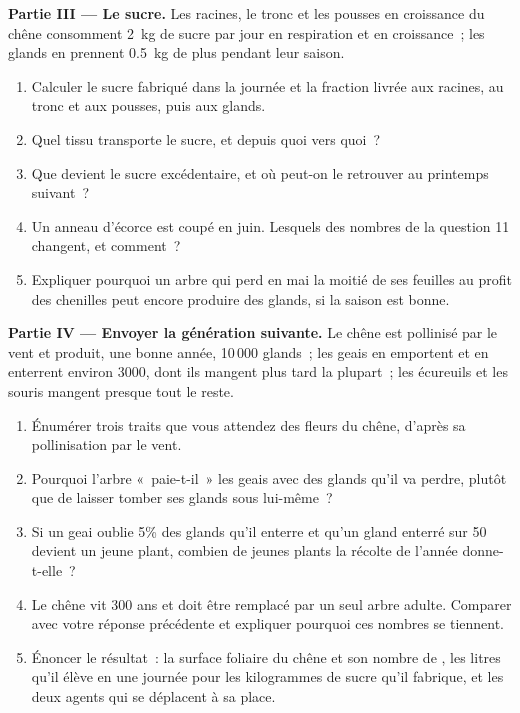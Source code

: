 \begin{problem}
\medskip
\noindent\textbf{Partie III --- Le sucre.}
Les racines, le tronc et les pousses en croissance du chêne consomment
\qty{2}{kg} de sucre par jour en respiration et en croissance~; les
glands en prennent \qty{0.5}{kg} de plus pendant leur saison.
\begin{enumerate}[resume]
  \item Calculer le sucre fabriqué dans la journée et la fraction
        livrée aux racines, au tronc et aux pousses, puis aux glands.
  \item Quel tissu transporte le sucre, et depuis quoi vers quoi~?
  \item Que devient le sucre excédentaire, et où peut-on le retrouver
        au printemps suivant~?
  \item Un anneau d'écorce est coupé en juin. Lesquels des nombres de
        la question 11 changent, et comment~?
  \item Expliquer pourquoi un arbre qui perd en mai la moitié de ses
        feuilles au profit des chenilles peut encore produire des
        glands, si la saison est bonne.
\end{enumerate}

\medskip
\noindent\textbf{Partie IV --- Envoyer la génération suivante.}
Le chêne est pollinisé par le vent et produit, une bonne année,
10\,000 glands~; les geais en emportent et en enterrent environ 3000,
dont ils mangent plus tard la plupart~; les écureuils et les souris
mangent presque tout le reste.
\begin{enumerate}[resume]
  \item Énumérer trois traits que vous attendez des fleurs du chêne,
        d'après sa pollinisation par le vent.
  \item Pourquoi l'arbre «~paie-t-il~» les geais avec des glands qu'il
        va perdre, plutôt que de laisser tomber ses glands sous
        lui-même~?
  \item Si un geai oublie 5\% des glands qu'il enterre et qu'un gland
        enterré sur 50 devient un jeune plant, combien de jeunes
        plants la récolte de l'année donne-t-elle~?
  \item Le chêne vit 300 ans et doit être remplacé par un seul arbre
        adulte. Comparer avec votre réponse précédente et expliquer
        pourquoi ces nombres se tiennent.
  \item Énoncer le résultat~: la surface foliaire du chêne et son
        nombre de , les litres qu'il élève en une journée pour
        les kilogrammes de sucre qu'il fabrique, et les deux agents
        qui se déplacent à sa place.
\end{enumerate}
\end{problem}
